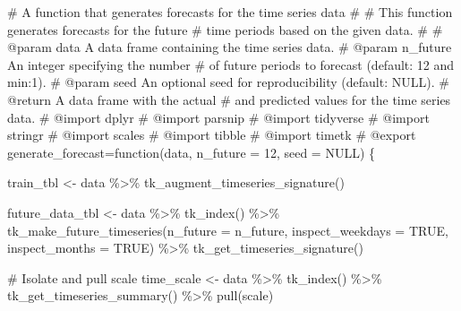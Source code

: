 \documentclass[
  11pt,
]{article}
\newenvironment{Shaded}{\begin{snugshade}}{\end{snugshade}}
\newcommand{\AttributeTok}[1]{\textcolor[rgb]{0.40,0.45,0.13}{#1}}
\newcommand{\CommentTok}[1]{\textcolor[rgb]{0.37,0.37,0.37}{#1}}
\newcommand{\ConstantTok}[1]{\textcolor[rgb]{0.56,0.35,0.01}{#1}}
\newcommand{\ControlFlowTok}[1]{\textcolor[rgb]{0.00,0.23,0.31}{#1}}
\newcommand{\DecValTok}[1]{\textcolor[rgb]{0.68,0.00,0.00}{#1}}
\newcommand{\FunctionTok}[1]{\textcolor[rgb]{0.28,0.35,0.67}{#1}}
\newcommand{\NormalTok}[1]{\textcolor[rgb]{0.00,0.23,0.31}{#1}}
\newcommand{\OtherTok}[1]{\textcolor[rgb]{0.00,0.23,0.31}{#1}}
\newcommand{\SpecialCharTok}[1]{\textcolor[rgb]{0.37,0.37,0.37}{#1}}
\begin{document}
\begin{Shaded}
\begin{Highlighting}[]
\CommentTok{\#\textquotesingle{} A function that generates forecasts for the time series data}
\CommentTok{\#\textquotesingle{}}
\CommentTok{\#\textquotesingle{} This function generates forecasts for the future}
\CommentTok{\#\textquotesingle{} time periods based on the given data.}
\CommentTok{\#\textquotesingle{}}
\CommentTok{\#\textquotesingle{} @param data A data frame containing the time series data.}
\CommentTok{\#\textquotesingle{} @param n\_future An integer specifying the number}
\CommentTok{\#\textquotesingle{} of future periods to forecast (default: 12 and min:1).}
\CommentTok{\#\textquotesingle{} @param seed An optional seed for reproducibility (default: NULL).}
\CommentTok{\#\textquotesingle{} @return A data frame with the actual}
\CommentTok{\#\textquotesingle{} and predicted values for the time series data.}
\CommentTok{\#\textquotesingle{} @import dplyr}
\CommentTok{\#\textquotesingle{} @import parsnip}
\CommentTok{\#\textquotesingle{} @import tidyverse}
\CommentTok{\#\textquotesingle{} @import stringr}
\CommentTok{\#\textquotesingle{} @import scales}
\CommentTok{\#\textquotesingle{} @import tibble}
\CommentTok{\#\textquotesingle{} @import timetk}
\CommentTok{\#\textquotesingle{} @export}
\NormalTok{generate\_forecast}\OtherTok{=}\ControlFlowTok{function}\NormalTok{(data, }\AttributeTok{n\_future =} \DecValTok{12}\NormalTok{, }\AttributeTok{seed =} \ConstantTok{NULL}\NormalTok{) \{}

\NormalTok{  train\_tbl }\OtherTok{\textless{}{-}}\NormalTok{ data }\SpecialCharTok{\%\textgreater{}\%}
    \FunctionTok{tk\_augment\_timeseries\_signature}\NormalTok{()}

\NormalTok{  future\_data\_tbl }\OtherTok{\textless{}{-}}\NormalTok{ data }\SpecialCharTok{\%\textgreater{}\%}
    \FunctionTok{tk\_index}\NormalTok{() }\SpecialCharTok{\%\textgreater{}\%}
    \FunctionTok{tk\_make\_future\_timeseries}\NormalTok{(}\AttributeTok{n\_future =}\NormalTok{ n\_future, }\AttributeTok{inspect\_weekdays =} \ConstantTok{TRUE}\NormalTok{, }\AttributeTok{inspect\_months =} \ConstantTok{TRUE}\NormalTok{) }\SpecialCharTok{\%\textgreater{}\%}
    \FunctionTok{tk\_get\_timeseries\_signature}\NormalTok{()}

  \CommentTok{\# Isolate and pull scale}
\NormalTok{  time\_scale }\OtherTok{\textless{}{-}}\NormalTok{  data }\SpecialCharTok{\%\textgreater{}\%}
    \FunctionTok{tk\_index}\NormalTok{() }\SpecialCharTok{\%\textgreater{}\%}
    \FunctionTok{tk\_get\_timeseries\_summary}\NormalTok{() }\SpecialCharTok{\%\textgreater{}\%}
    \FunctionTok{pull}\NormalTok{(scale)}


\end{Highlighting}
\end{Shaded}
\end{document}
